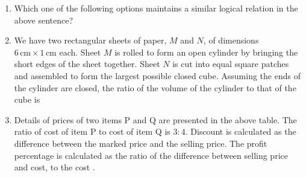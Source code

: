 \documentclass[journal,12pt,onecolumn]{IEEEtran}
\theoremstyle{remark}
\begin{document}
\begin{enumerate}[start=1, label=Q.\arabic*]
\hfill{}


\item {}  

Which one of the following options maintains a similar logical relation in the above sentence?
\begin{enumerate}
\end{enumerate}

\hfill{}

\item We have two rectangular sheets of paper, $M$ and $N$, of dimensions $6 \,\text{cm} \times 1 \,\text{cm}$ each.  
Sheet $M$ is rolled to form an open cylinder by bringing the short edges of the sheet together.  
Sheet $N$ is cut into equal square patches and assembled to form the largest possible closed cube.  
Assuming the ends of the cylinder are closed, the ratio of the volume of the cylinder to that of the cube is
\begin{enumerate}
\end{enumerate}

\hfill{}
\item 


\noindent Details of prices of two items P and Q are presented in the above table.  
The ratio of cost of item P to cost of item Q is $3: 4$.  
Discount is calculated as the difference between the marked price and the selling price.  
The profit percentage is calculated as the ratio of the difference between selling price and cost, to the cost .  


\end{enumerate}
\end{document}
